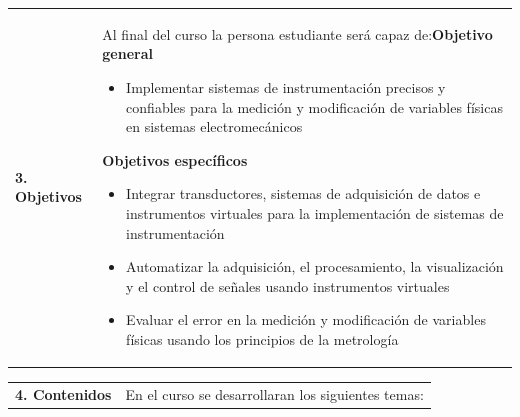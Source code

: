 \documentclass[letterpaper]{article}%
\begin{document}
\vspace*{4mm}%
\newline%
\begin{tabularx}{\textwidth}{p{3cm}p{13cm}}%
\par\fontsize{12}{14}\selectfont \textbf{\textcolor{parte}{3. Objetivos}}&Al final del curso la persona estudiante será capaz de:\newline\newline \textbf{Objetivo general}\begin{itemize}\item Implementar sistemas de instrumentación precisos y confiables para la medición y modificación de variables físicas en sistemas electromecánicos\end{itemize} \vspace{2mm}\textbf{Objetivos específicos}\begin{itemize}\item Integrar transductores, sistemas de adquisición de datos e instrumentos virtuales para la implementación de sistemas de instrumentación\item Automatizar la adquisición, el procesamiento, la visualización y el control de señales usando instrumentos virtuales\item Evaluar el error en la medición y modificación de variables físicas usando los principios de la metrología\end{itemize}\\%
\end{tabularx}%
\newpage%
\begin{tabularx}{\textwidth}{p{3cm}p{13cm}}%
\par\fontsize{12}{14}\selectfont \textbf{\textcolor{parte}{4. Contenidos}}&En el curso se desarrollaran los siguientes temas:\\%
\end{tabularx}%
\newline%
\end{document}
